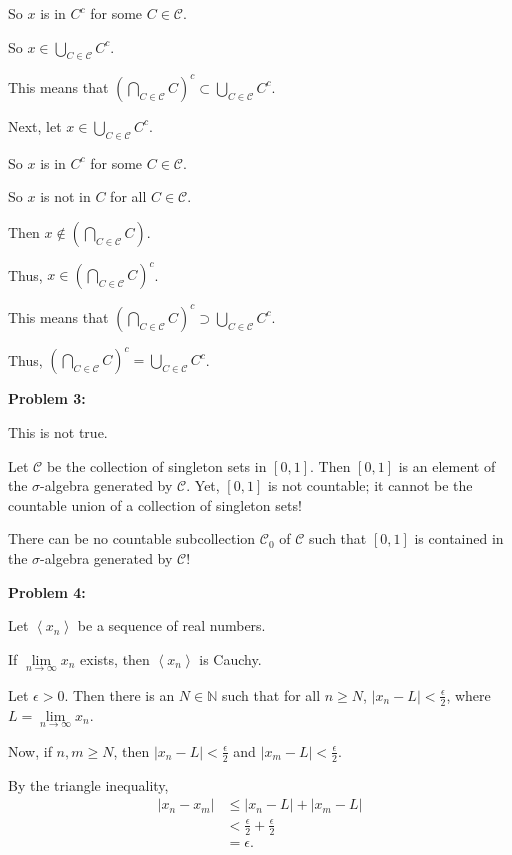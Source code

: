 \documentclass[a4paper,12pt]{article}
\newcommand{\tab}{\hspace{4mm}} %
\newcommand{\shunt}{\vspace{20mm}}
\newcommand{\absval}[1]{\lvert #1 \rvert}
\newcommand{\anbrack}[1]{\left\langle #1 \right\rangle}
\newcommand{\ep}{\epsilon}
\newcommand{\N}{\mathbb{N}}
\newcommand{\scrC}{\mathcal{C}}
\begin{document}
\tab So $x$ is in $C^c$ for some $C \in \scrC$.

\tab So $x \in \bigcup\limits_{C \in \scrC} C^c$.

This means that $(\bigcap\limits_{C \in \scrC} C)^c \subset \bigcup\limits_{C \in \scrC} C^c$.

Next, let $x \in \bigcup\limits_{C \in \scrC} C^c$.

\tab So $x$ is in $C^c$ for some $C \in \scrC$.

\tab So $x$ is not in $C$ for all $C \in \scrC$.

\tab Then $x \notin (\bigcap\limits_{C \in \scrC} C)$.

\tab Thus, $x \in (\bigcap\limits_{C \in \scrC} C)^c$.

This means that $(\bigcap\limits_{C \in \scrC} C)^c \supset \bigcup\limits_{C \in \scrC} C^c$.

Thus, $(\bigcap\limits_{C \in \scrC} C)^c = \bigcup\limits_{C \in \scrC} C^c$.

\shunt

{\bf Problem 3:}

This is not true.

Let $\scrC$ be the collection of singleton sets in $[0,1]$. Then $[0,1]$ is an element of the $\sigma$-algebra generated by $\scrC$. Yet, $[0,1]$ is not countable; it cannot be the countable union of a collection of singleton sets!

There can be no countable subcollection $\scrC_0$ of $\scrC$ such that $[0,1]$ is contained in the $\sigma$-algebra generated by $\scrC$!

\shunt

{\bf Problem 4:}

Let $\anbrack{x_n}$ be a sequence of real numbers.

If $\lim\limits_{n \to \infty} x_n$ exists, then $\anbrack{x_n}$ is Cauchy.

\tab Let $\ep >0$. Then there is an $N \in \N$ such that for all $n \geq N$, $\absval{x_n - L} < \frac{\ep}{2}$, where $L = \lim\limits_{n \to \infty} x_n$.

\tab Now, if $n,m \geq N$, then $\absval{x_n - L} < \frac{\ep}{2}$ and $\absval{x_m - L} < \frac{\ep}{2}$.

\tab By the triangle inequality,
\begin{align*}
\absval{x_n - x_m} &\leq \absval{x_n - L} + \absval{x_m -L} \\
&< \frac{\ep}{2} + \frac{\ep}{2} \\
&= \ep.
\end{align*}
\end{document}
